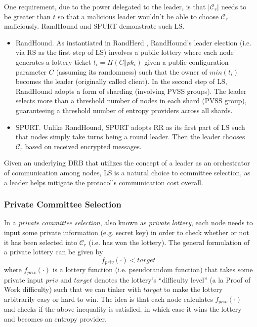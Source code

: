 \documentclass[conference]{IEEEtran}
\theoremstyle{definition}
\theoremstyle{remark}
\begin{document}
One requirement, due to the power delegated to the leader, is that $|\mathcal{C}_r|$ needs to be greater than $t$ so that a malicious leader wouldn't be able to choose $\mathcal{C}_r$ maliciously. RandHound \cite{syta2017scalable} and SPURT \cite{das2021spurt} demonstrate such LS.
\begin{itemize}
\item RandHound. As instantiated in RandHerd \cite{syta2017scalable}, RandHound's leader election (i.e. via RS as the first step of LS) involves a public lottery where each node generates a lottery ticket $t_i = H(C \mathbin\Vert pk_i)$ given a public configuration parameter $C$ (assuming its randomness) such that the owner of $min(t_i)$ becomes the leader (originally called client). In the second step of LS, RandHound adopts a form of sharding (involving PVSS groups). The leader selects more than a threshold number of nodes in each shard (PVSS group), guaranteeing a threshold number of entropy providers across all shards.
\item SPURT. Unlike RandHound, SPURT adopts RR as its first part of LS such that nodes simply take turns being a round leader. Then the leader chooses $\mathcal{C}_r$ based on received encrypted messages.
\end{itemize}

Given an underlying DRB that utilizes the concept of a leader as an orchestrator of communication among nodes, LS is a natural choice to committee selection, as a leader helps mitigate the protocol's communication cost overall.

\subsubsection{Private Committee Selection}
\label{subsubsection:private-committee-selection}
In a \textit{private committee selection}, also known as \textit{private lottery}, each node needs to input some private information (e.g. secret key) in order to check whether or not it has been selected into $\mathcal{C}_r$ (i.e. has won the lottery). The general formulation of a private lottery can be given by
\[
f_{priv}(\cdot) < target
\]
where $f_{priv}(\cdot)$ is a lottery function (i.e. pseudorandom function) that takes some private input $priv$ and $target$ denotes the lottery's ``difficulty level'' (a la Proof of Work difficulty) such that we can tinker with $target$ to make the lottery arbitrarily easy or hard to win. The idea is that each node calculates $f_{priv}(\cdot)$ and checks if the above inequality is satisfied, in which case it wins the lottery and becomes an entropy provider.
\end{document}
